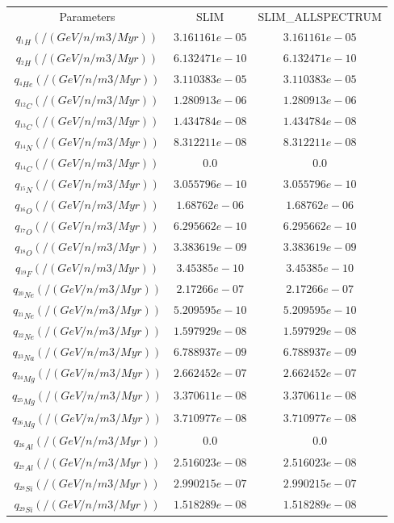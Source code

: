 \begin{tabular}{c |c |c}
	Parameters & SLIM &SLIM_ALLSPECTRUM \\ 
	\cline{1-3}
	$q_{^{1}H} (/(GeV/n/m3/Myr))$ & $3.161161e-05$ &$3.161161e-05$ \\ 
	$q_{^{2}H} (/(GeV/n/m3/Myr))$ & $6.132471e-10$ &$6.132471e-10$ \\ 
	$q_{^{4}He} (/(GeV/n/m3/Myr))$ & $3.110383e-05$ &$3.110383e-05$ \\ 
	$q_{^{12}C} (/(GeV/n/m3/Myr))$ & $1.280913e-06$ &$1.280913e-06$ \\ 
	$q_{^{13}C} (/(GeV/n/m3/Myr))$ & $1.434784e-08$ &$1.434784e-08$ \\ 
	$q_{^{14}N} (/(GeV/n/m3/Myr))$ & $8.312211e-08$ &$8.312211e-08$ \\ 
	$q_{^{14}C} (/(GeV/n/m3/Myr))$ & $0.0$ &$0.0$ \\ 
	$q_{^{15}N} (/(GeV/n/m3/Myr))$ & $3.055796e-10$ &$3.055796e-10$ \\ 
	$q_{^{16}O} (/(GeV/n/m3/Myr))$ & $1.68762e-06$ &$1.68762e-06$ \\ 
	$q_{^{17}O} (/(GeV/n/m3/Myr))$ & $6.295662e-10$ &$6.295662e-10$ \\ 
	$q_{^{18}O} (/(GeV/n/m3/Myr))$ & $3.383619e-09$ &$3.383619e-09$ \\ 
	$q_{^{19}F} (/(GeV/n/m3/Myr))$ & $3.45385e-10$ &$3.45385e-10$ \\ 
	$q_{^{20}Ne} (/(GeV/n/m3/Myr))$ & $2.17266e-07$ &$2.17266e-07$ \\ 
	$q_{^{21}Ne} (/(GeV/n/m3/Myr))$ & $5.209595e-10$ &$5.209595e-10$ \\ 
	$q_{^{22}Ne} (/(GeV/n/m3/Myr))$ & $1.597929e-08$ &$1.597929e-08$ \\ 
	$q_{^{23}Na} (/(GeV/n/m3/Myr))$ & $6.788937e-09$ &$6.788937e-09$ \\ 
	$q_{^{24}Mg} (/(GeV/n/m3/Myr))$ & $2.662452e-07$ &$2.662452e-07$ \\ 
	$q_{^{25}Mg} (/(GeV/n/m3/Myr))$ & $3.370611e-08$ &$3.370611e-08$ \\ 
	$q_{^{26}Mg} (/(GeV/n/m3/Myr))$ & $3.710977e-08$ &$3.710977e-08$ \\ 
	$q_{^{26}Al} (/(GeV/n/m3/Myr))$ & $0.0$ &$0.0$ \\ 
	$q_{^{27}Al} (/(GeV/n/m3/Myr))$ & $2.516023e-08$ &$2.516023e-08$ \\ 
	$q_{^{28}Si} (/(GeV/n/m3/Myr))$ & $2.990215e-07$ &$2.990215e-07$ \\ 
	$q_{^{29}Si} (/(GeV/n/m3/Myr))$ & $1.518289e-08$ &$1.518289e-08$ \\ 

\end{tabular}
